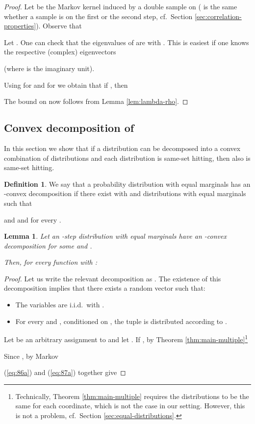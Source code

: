 \documentclass{daj}
\newcommand{\1}{\mathbbm{1}}
\theoremstyle{plain}
\newtheorem{lemma}[theorem]{Lemma}
\theoremstyle{definition}
\newtheorem{definition}[theorem]{Definition}
\begin{document}
\begin{proof}
Let  be the Markov kernel induced by a double sample on 
( is the same whether a sample is on the first or the second step,
cf.~Section \ref{sec:correlation-properties}). Observe that

Let .
One can check that the eigenvalues
of  are 
with . 
This is easiest if one knows the respective (complex) eigenvectors 
 
(where  is the imaginary unit).

Using  for 
and  for  we obtain that if ,
then


The bound on  now follows from Lemma \ref{lem:lambda-rho}.
\end{proof}

\subsection{Convex decomposition of 
\texorpdfstring{}{P}}

In this section we show that if a distribution  
can be decomposed into a convex combination
of distributions  and each 
distribution  is same-set hitting, 
then also  is same-set hitting.

\begin{definition}
We say that a probability distribution with equal marginals  has an
\emph{}-convex decomposition if there exist 
 with 
and distributions with equal marginals
 such that

and  and  for every .
\end{definition}

\begin{lemma}
\label{lem:convex-decomposition}
Let an -step distribution  with equal marginals have an
-convex decomposition
for some  and . 

Then, for every function  with 
:

\end{lemma}

\begin{proof}
Let us write the relevant decomposition as .
The existence of this decomposition implies that there exists a random vector
 such that:
\begin{itemize}
  \item The variables  are i.i.d.~with .
  \item For every  and , conditioned on ,
    the tuple  is distributed according to .
\end{itemize}

Let  be an arbitrary assignment to  and let
.
If , by Theorem \ref{thm:main-multiple}\footnote{
  Technically, Theorem \ref{thm:main-multiple} requires the distributions to
be the same for each coordinate, which is not the case in our setting. However,
this is not a problem, cf.~Section \ref{sec:equal-distributions}.
}


Since , by Markov

(\ref{eq:86a}) and (\ref{eq:87a}) together give
 
\end{proof}
\end{document}
